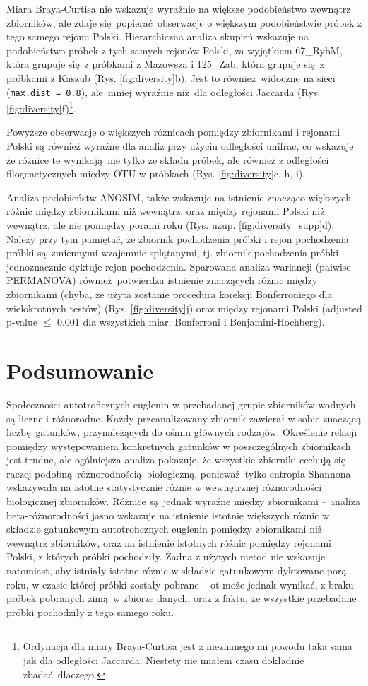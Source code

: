 \documentclass[two column, twoside, a4paper]{article}
\begin{document}
Miara Braya-Curtisa nie wskazuje wyraźnie na większe podobieństwo wewnątrz zbiorników, ale zdaje się popierać obserwacje o większym podobieństwie próbek z tego samego rejonu Polski. Hierarchiczna analiza skupień wskazuje na podobieństwo próbek z tych samych rejonów Polski, za wyjątkiem 67\_RybM, która grupuje się z próbkami z Mazowsza i 125\_Zab, która grupuje się z próbkami z Kaszub (Rys. \ref{fig:diversity}b). Jest to również widoczne na sieci (\texttt{max.dist = 0.8}), ale mniej wyraźnie niż dla odległości Jaccarda (Rys. \ref{fig:diversity}f)\footnote{Ordynacja dla miary Braya-Curtisa jest z nieznanego mi powodu taka sama jak dla odległości Jaccarda. Niestety nie miałem czasu dokładnie zbadać dlaczego.}.

Powyższe obserwacje o większych różnicach pomiędzy zbiornikami i rejonami Polski są również wyraźne dla analiz przy użyciu odległości unifrac, co wskazuje że różnice te wynikają nie tylko ze składu próbek, ale również z odległości filogenetycznych między OTU w próbkach (Rys. \ref{fig:diversity}c, h, i). 

Analiza podobieństw ANOSIM, także wskazuje na istnienie znacząco większych różnic między zbiornikami niż wewnątrz, oraz między rejonami Polski niż wewnątrz, ale nie pomiędzy porami roku (Rys. uzup. \ref{fig:diversity_supp}d). Należy przy tym pamiętać, że zbiornik pochodzenia próbki i rejon pochodzenia próbki są zmiennymi wzajemnie splątanymi, tj. zbiornik pochodzenia próbki jednoznacznie dyktuje rejon pochodzenia. Sparowana analiza wariancji (paiwise PERMANOVA) również potwierdza istnienie znaczących różnic między zbiornikami (chyba, że użyta zostanie procedura korekcji Bonferroniego dla wielokrotnych testów) (Rys. \ref{fig:diversity}j) oraz między rejonami Polski (adjusted p-value $\leqslant$ 0.001 dla wszystkich miar; Bonferroni i Benjamini-Hochberg).


\section{Podsumowanie}

Społeczności autotroficznych euglenin w przebadanej grupie zbiorników wodnych są liczne i różnorodne. Każdy przeanalizowany zbiornik zawierał w sobie znaczącą liczbę gatunków, przynależących do ośmiu głównych rodzajów. Określenie relacji pomiędzy występowaniem konkretnych gatunków w poszczególnych zbiornikach jest trudne, ale ogólniejsza analiza pokazuje, że wszystkie zbiorniki cechują się raczej podobną różnorodnością biologiczną, ponieważ tylko entropia Shannona wskazywała na istotne statystycznie różnie w wewnętrznej różnorodności biologicznej zbiorników. Różnice są jednak wyraźne między zbiornikami -- analiza beta-różnorodności jasno wskazuje na istnienie istotnie większych różnic w składzie gatunkowym autotroficznych euglenin pomiędzy zbiornikami niż wewnątrz zbiorników, oraz na istnienie istotnych różnic pomiędzy rejonami Polski, z których próbki pochodziły. Żadna z użytych metod nie wskazuje natomiast, aby istniały istotne różnie w składzie gatunkowym dyktowane porą roku, w czasie której próbki zostały pobrane -- ot może jednak wynikać, z braku próbek pobranych zimą w zbiorze danych, oraz z faktu, że wszystkie przebadane próbki pochodziły z tego samego roku.
\end{document}
